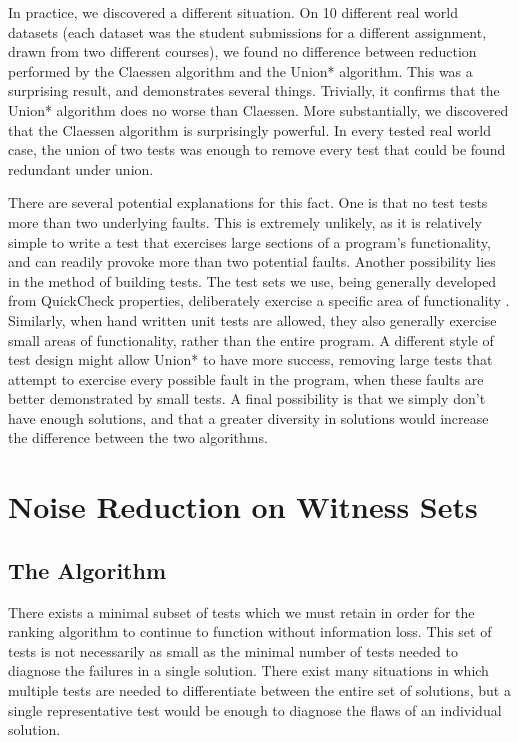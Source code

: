 \documentclass[11pt,twoside]{article}
\let\cite=\citep
\begin{document}
In practice, we discovered a different situation. On 10 different real world datasets (each dataset was the student submissions for a different assignment, drawn from two different courses), we found no difference between reduction performed by the Claessen algorithm and the Union* algorithm. This was a surprising result, and demonstrates several things. Trivially, it confirms that the Union* algorithm does no worse than Claessen. More substantially, we discovered that the Claessen algorithm is surprisingly powerful. In every tested real world case, the union of two tests was enough to remove every test that could be found redundant under union.

There are several potential explanations for this fact. One is that no test tests more than two underlying faults. This is extremely unlikely, as it is relatively simple to write a test that exercises large sections of a program's functionality, and can readily provoke more than two potential faults. Another possibility lies in the method of building tests. The test sets we use, being generally developed from QuickCheck properties, deliberately exercise a specific area of functionality \cite{QuickCheck}. Similarly, when hand written unit tests are allowed, they also generally exercise small areas of functionality, rather than the entire program. A different style of test design might allow Union* to have more success, removing large tests that attempt to exercise every possible fault in the program, when these faults are better demonstrated by small tests. A final possibility is that we simply don't have enough solutions, and that a greater diversity in solutions would increase the difference between the two algorithms.

\section{Noise Reduction on Witness Sets}
\subsection{The Algorithm}
There exists a minimal subset of tests which we must retain in order for the ranking algorithm to continue to function without information loss. This set of tests is not necessarily as small as the minimal number of tests needed to diagnose the failures in a single solution. There exist many situations in which multiple tests are needed to differentiate between the entire set of solutions, but a single representative test would be enough to diagnose the flaws of an individual solution.
\end{document}
